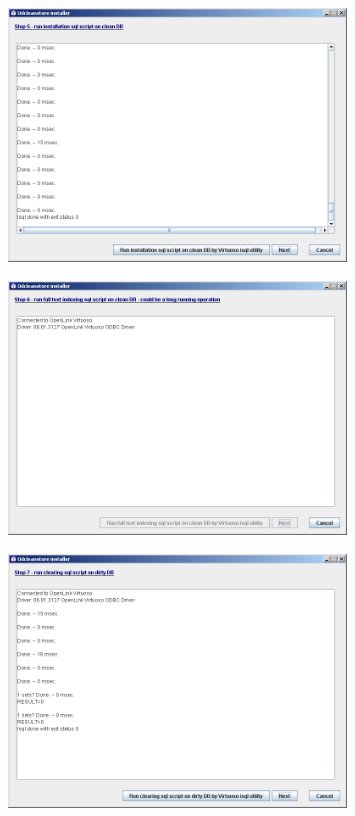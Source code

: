 \begin{figure}[!h]
    \centering
    \includegraphics[width=0.8\textwidth]{images/install-step05.png}
\end{figure}

\FloatBarrier

\begin{figure}[!h]
    \centering
    \includegraphics[width=0.8\textwidth]{images/install-step06.png}
\end{figure}

\FloatBarrier

\begin{figure}[!h]
    \centering
    \includegraphics[width=0.8\textwidth]{images/install-step07.png}
\end{figure}

